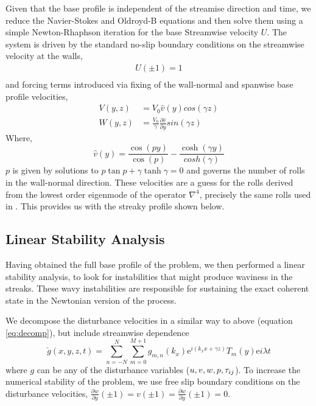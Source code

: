 \documentclass{jfm}
\newcommand{\dy}[1]{\frac{\partial #1}{\partial y}}
\newcommand{\me}{\mathrm{e}}
\begin{document}
Given that the base profile is independent of the streamise direction and time, we reduce the Navier-Stokes and Oldroyd-B equations and then solve them using a simple Newton-Rhaphson iteration for the base Streamwise velocity $U$. The system is driven by the standard no-slip boundary conditions on the streamwise velocity at the walls,
\begin{align}
    U(\pm 1) = 1 \\
\end{align}
and forcing terms introduced via fixing of the wall-normal and spanwise base profile velocities,
\begin{align}
    V(y,z) &= V_0 \hat{v}(y) cos(\gamma z) \\
    W(y,z) &= \frac{V_0}{\gamma} \dy{\hat{v}} sin(\gamma z) 
\end{align}
Where,
\begin{equation}
    \hat{v}(y) = \frac{\cos(py)}{\cos(p)} - \frac{\cosh(\gamma y)}{cosh(\gamma)} 
\end {equation}
$p$ is given by solutions to $p\tan p + \gamma \tanh \gamma = 0$ and governs the number of rolls in the wall-normal direction. These velocities are a guess for the rolls derived from the lowest order eigenmode of the operator $\nabla^{4}$, precisely the same rolls used in \cite{Waleffe97}. This provides us with the streaky profile shown below.

\subsection{Linear Stability Analysis}

Having obtained the full base profile of the problem, we then performed a linear stability analysis, to look for instabilities that might produce waviness in the streaks. These wavy instabilities are responsible for sustaining the exact coherent state in the Newtonian version of the process.

We decompose the disturbance velocities in a similar way to above (equation \ref{eq:decomp}), but include streamwise dependence
\begin{equation}
    \check{g}(x,y,z,t) = \sum_{n=-N}^{N} \sum_{m=0}^{M+1} g_{m,n}(k_{x}) \me^{i(k_{x} x + \gamma z)} T_{m}(y) \me{i\lambda t}\label{eq:decomp_disturbances}
\end{equation}
where $g$ can be any of the disturbance variables ($u,v,w,p,\boldmath{\tau}_{ij}$). To increase the numerical stability of the problem, we use free slip boundary conditions on the disturbance velocities, $\dy{w}(\pm1) = v(\pm 1) = \dy{w}(\pm1) = 0$.
\end{document}
